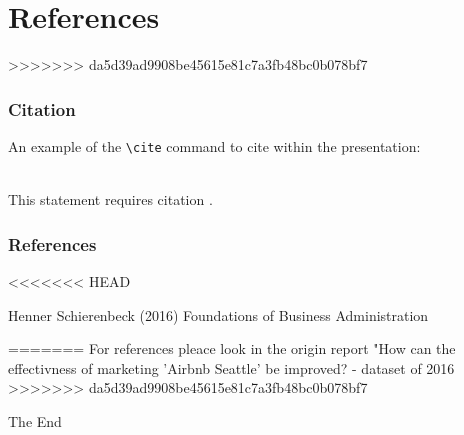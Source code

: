 \documentclass{beamer}
\begin{document}
\begin{frame}
\end{frame}
\section{References}
>>>>>>> da5d39ad9908be45615e81c7a3fb48bc0b078bf7

\begin{frame}[fragile] %
\frametitle{Citation}
An example of the \verb|\cite| command to cite within the presentation:\\~

This statement requires citation \cite{p1}.
\end{frame}


\begin{frame}
\frametitle{References}
<<<<<<< HEAD
\footnotesize{
\begin{thebibliography}{99} %
 Henner Schierenbeck (2016)
\newblock Foundations of Business Administration
\end{thebibliography}
}
=======
For references pleace look in the origin report "How can the effectivness of marketing 'Airbnb Seattle' be improved? - dataset of 2016 
>>>>>>> da5d39ad9908be45615e81c7a3fb48bc0b078bf7
\end{frame}


\begin{frame}
\Huge{\centerline{The End}}
\end{frame}

\end{document}
